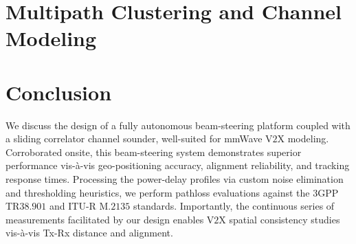 \documentclass[12pt, draftcls, onecolumn]{IEEEtran}
\begin{document}
\section{Multipath Clustering and Channel Modeling}\label{S5}
\vspace{-4mm}

\section{Conclusion}\label{S6}
We discuss the design of a fully autonomous beam-steering platform coupled with a sliding correlator channel sounder, well-suited for mmWave V$2$X modeling. Corroborated onsite, this beam-steering system demonstrates superior performance vis-\`{a}-vis geo-positioning accuracy, alignment reliability, and tracking response times. Processing the power-delay profiles via custom noise elimination and thresholding heuristics, we perform pathloss evaluations against the $3$GPP TR$38.901$ and ITU-R M$.2135$ standards. Importantly, the continuous series of measurements facilitated by our design enables V$2$X spatial consistency studies vis-\`{a}-vis Tx-Rx distance and alignment.
\vspace{-4mm}


 
\end{document}
